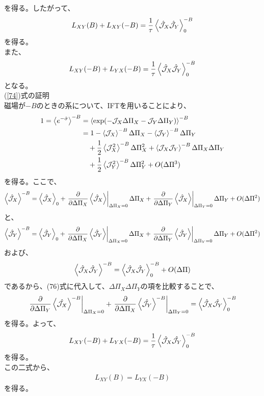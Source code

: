 \documentclass[a4paper,11pt]{jsarticle}
\begin{document}
を得る。したがって、
\begin{align}
    L_{XY} (B) + L_{XY} (-B) = \frac{1}{\tau} \ev{\hat{\mathcal{J}}_X \hat{\mathcal{J}}_Y}_0^{-B}
\end{align}
を得る。\\
また、
\begin{align}
    \label{74}
    L_{XY} (-B) + L_{YX} (-B) = \frac{1}{\tau} \ev{\hat{\mathcal{J}}_X \hat{\mathcal{J}}_Y}_0^{-B}
\end{align}
となる。\\
(\ref{74})式の証明\\
磁場が$-B$のときの系について、IFTを用いることにより、
\begin{align}
    1=\ev{e^{-\hat{\sigma}}}^{-B} &= \ev{\exp(-\mathcal{J}_X \Delta \Pi_X - \mathcal{J}_Y \Delta \Pi_Y)}^{-B}\\
    &= 1-\ev{\mathcal{J}_X}^{-B} \Delta \Pi_X - \ev{\mathcal{J}_Y}^{-B} \Delta \Pi_Y \\
    &\quad+ \frac{1}{2}\ev{\mathcal{J}_X^2}^{-B} \Delta \Pi_X^2 + \ev{\mathcal{J}_X \mathcal{J}_Y}^{-B} \Delta \Pi_X \Delta \Pi_Y \\
    &\quad+ \frac{1}{2}\ev{\mathcal{J}_Y^2}^{-B} \Delta \Pi_Y^2 + O(\Delta \Pi^3)
\end{align}
を得る。ここで、
\begin{align}
    \ev{\hat{\mathcal{J}}_X}^{-B} = \ev{\hat{\mathcal{J}}_X}_0 + \left.\pdv{\Delta \Pi_X} \ev{\hat{\mathcal{J}}_X}\right|_{\Delta \Pi_X = 0} \Delta \Pi_X +\left.\pdv{\Delta \Pi_Y} \ev{\hat{\mathcal{J}}_X}\right|_{\Delta \Pi_Y = 0} \Delta \Pi_Y + O(\Delta \Pi^2)
\end{align}
と、
\begin{align}
    \ev{\hat{\mathcal{J}}_Y}^{-B} = \ev{\hat{\mathcal{J}}_Y}_0 + \left.\pdv{\Delta \Pi_X} \ev{\hat{\mathcal{J}}_Y}\right|_{\Delta \Pi_X = 0} \Delta \Pi_X +\left.\pdv{\Delta \Pi_Y} \ev{\hat{\mathcal{J}}_Y}\right|_{\Delta \Pi_Y = 0} \Delta \Pi_Y + O(\Delta \Pi^2)
\end{align}
および、
\begin{align}
    \ev{\hat{\mathcal{J}}_X \hat{\mathcal{J}}_Y}^{-B} = \ev{\hat{\mathcal{J}}_X \hat{\mathcal{J}}_Y}^{-B}_0 +O(\Delta \Pi)
\end{align}
であるから、(76)式に代入して、$\Delta \Pi_X \Delta \Pi_Y$の項を比較することで、
\begin{align}
    \left.\pdv{\Delta \Pi_Y} \ev{\hat{\mathcal{J}_X}}^{-B}\right|_{\Delta \Pi_X = 0} + \left.\pdv{\Delta \Pi_X} \ev{\hat{\mathcal{J}_Y}}^{-B}\right|_{\Delta \Pi_Y = 0} = \ev{\hat{\mathcal{J}}_X \hat{\mathcal{J}_Y}}^{-B}_0
\end{align}
を得る。よって、
\begin{align}
    L_{XY} (-B) + L_{YX} (-B) = \frac{1}{\tau}\ev{\hat{\mathcal{J}}_X \hat{\mathcal{J}_Y}}^{-B}_0
\end{align}
を得る。\\


この二式から、
\begin{align}
    L_{XY} (B) = L_{YX} (-B)
\end{align}
を得る。\hfill \qedsymbol
\end{document}
